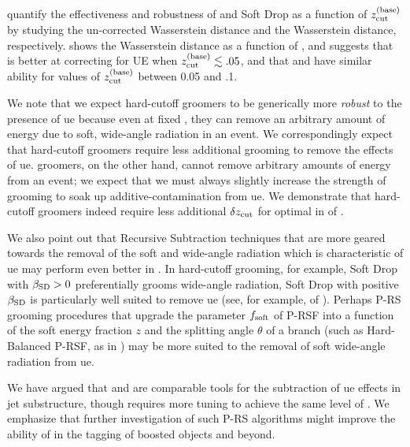  quantify the effectiveness and robustness of  and Soft Drop as a function of \(z_{\rm cut}^{(\rm base)}\) by studying the un-corrected Wasserstein distance and the  Wasserstein distance, respectively.
%
 shows the  Wasserstein distance as a function of \zcut, and suggests that  is better at correcting for UE when \(z_{\rm cut}^{(\rm base)} \lesssim .05\), and that  and  have similar  ability for values of \(z_{\rm cut}^{(\rm base)}\) between 0.05 and .1.

We note that we expect hard-cutoff groomers to be generically more \textit{robust} to the presence of \gls{ue} because even at fixed \zcut, they can remove an arbitrary amount of energy due to soft, wide-angle radiation in an event.
%
We correspondingly expect that hard-cutoff groomers require less additional grooming to remove the effects of \gls{ue}.
%
\PIRANHA{} groomers, on the other hand, cannot remove arbitrary amounts of energy from an event;
%
we expect that we must always slightly increase the strength of \PIRANHA{} grooming to soak up \gls{additive-contamination} from \gls{ue}.
%
We demonstrate that hard-cutoff groomers indeed require less additional \(\delta z_{\rm cut}\) for optimal  in  of .

    We also point out that Recursive Subtraction techniques that are more geared towards the removal of the soft and wide-angle radiation which is characteristic of \gls{ue} may perform even better in .
    In hard-cutoff grooming, for example, Soft Drop with \(\beta_{\rm SD} > 0\) preferentially grooms wide-angle radiation, Soft Drop with positive \(\beta_{\rm SD}\) is particularly well suited to remove \gls{ue} (see, for example,  of ).
   Perhaps P-RS grooming procedures that upgrade the parameter \(f_{\rm soft}\) of P-RSF into a function of the soft energy fraction \(z\) and the splitting angle \(\theta\) of a branch  (such as Hard-Balanced P-RSF, as in ) may be more suited to the removal of soft wide-angle radiation from \gls{ue}.

   We have argued that  and  are comparable tools for the subtraction of \gls{ue} effects in jet substructure, though  requires more tuning to achieve the same level of .
   We emphasize that further investigation of such P-RS algorithms might improve the ability of \PIRANHA{} in the tagging of boosted objects and beyond.


